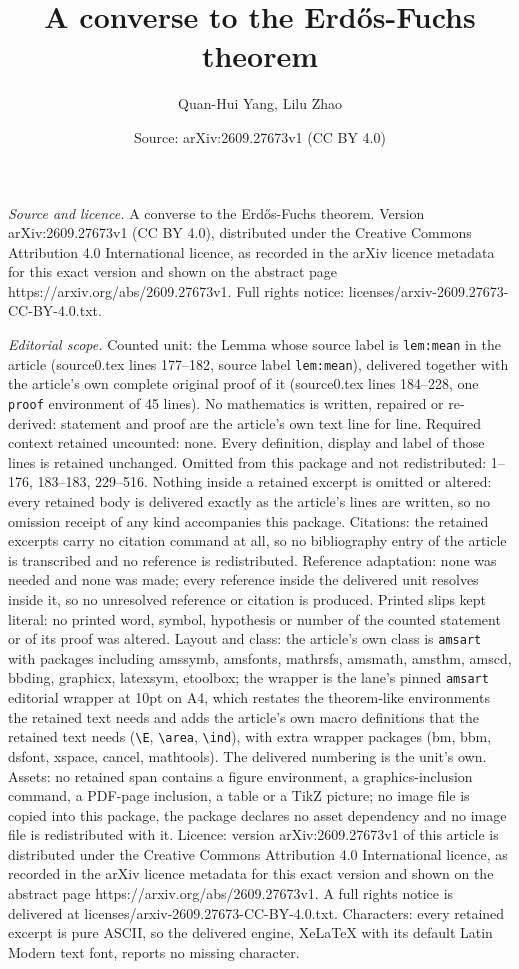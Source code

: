 \documentclass[10pt,a4paper]{amsart}
\title[A converse to the Erd\H{o}s-Fuchs theorem]{A converse to the Erd\H{o}s-Fuchs theorem}
\author{Quan-Hui Yang, Lilu Zhao}
\date{Source: arXiv:2609.27673v1 (CC BY 4.0)}
\begin{document}
\maketitle

\noindent\emph{Source and licence.} A converse to the Erd\H{o}s-Fuchs theorem. Version arXiv:2609.27673v1 (CC BY 4.0), distributed under the Creative Commons Attribution 4.0 International licence, as recorded in the arXiv licence metadata for this exact version and shown on the abstract page https://arxiv.org/abs/2609.27673v1. Full rights notice: licenses/arxiv-2609.27673-CC-BY-4.0.txt.\par\smallskip

\noindent\textit{Editorial scope.} Counted unit: the Lemma whose source label is \texttt{lem:mean} in the article (source0.tex lines 177--182, source label \texttt{lem:mean}), delivered together with the article's own complete original proof of it (source0.tex lines 184--228, one \texttt{proof} environment of 45 lines). No mathematics is written, repaired or re-derived: statement and proof are the article's own text line for line. Required context retained uncounted: none. Every definition, display and label of those lines is retained unchanged. Omitted from this package and not redistributed: 1--176, 183--183, 229--516. Nothing inside a retained excerpt is omitted or altered: every retained body is delivered exactly as the article's lines are written, so no omission receipt of any kind accompanies this package. Citations: the retained excerpts carry no citation command at all, so no bibliography entry of the article is transcribed and no reference is redistributed. Reference adaptation: none was needed and none was made; every reference inside the delivered unit resolves inside it, so no unresolved reference or citation is produced. Printed slips kept literal: no printed word, symbol, hypothesis or number of the counted statement or of its proof was altered. Layout and class: the article's own class is \texttt{amsart} with packages including amssymb, amsfonts, mathrsfs, amsmath, amsthm, amscd, bbding, graphicx, latexsym, etoolbox; the wrapper is the lane's pinned \texttt{amsart} editorial wrapper at 10pt on A4, which restates the theorem-like environments the retained text needs and adds the article's own macro definitions that the retained text needs (\texttt{\textbackslash E}, \texttt{\textbackslash area}, \texttt{\textbackslash ind}), with extra wrapper packages (bm, bbm, dsfont, xspace, cancel, mathtools). The delivered numbering is the unit's own. Assets: no retained span contains a figure environment, a graphics-inclusion command, a PDF-page inclusion, a table or a TikZ picture; no image file is copied into this package, the package declares no asset dependency and no image file is redistributed with it. Licence: version arXiv:2609.27673v1 of this article is distributed under the Creative Commons Attribution 4.0 International licence, as recorded in the arXiv licence metadata for this exact version and shown on the abstract page https://arxiv.org/abs/2609.27673v1. A full rights notice is delivered at licenses/arxiv-2609.27673-CC-BY-4.0.txt. Characters: every retained excerpt is pure ASCII, so the delivered engine, XeLaTeX with its default Latin Modern text font, reports no missing character.
\end{document}
